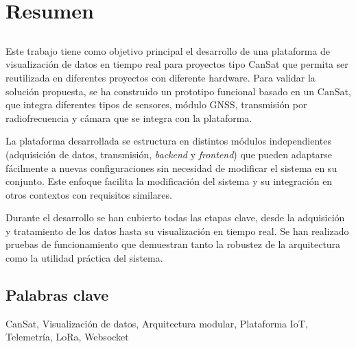 \chapter*{Resumen}


\section*{\titulo}

Este trabajo tiene como objetivo principal el desarrollo de una plataforma de visualización de datos en tiempo real para proyectos tipo CanSat que permita ser reutilizada en diferentes proyectos con diferente hardware.
Para validar la solución propuesta, se ha construido un prototipo funcional basado en un CanSat, que integra diferentes tipos de sensores, módulo GNSS, transmisión por radiofrecuencia y cámara que  se integra con la plataforma.

La plataforma desarrollada se estructura en distintos módulos independientes (adquisición de datos, transmisión, \emph{backend} y \emph{frontend}) que pueden adaptarse fácilmente a nuevas configuraciones sin necesidad de modificar el sistema en su conjunto.
Este enfoque facilita la modificación del sistema y su integración en otros contextos con requisitos similares.

Durante el desarrollo se han cubierto todas las etapas clave, desde la adquisición y tratamiento de los datos hasta su visualización en tiempo real.
Se han realizado pruebas de funcionamiento que demuestran tanto la robustez de la arquitectura como la utilidad práctica del sistema.


\section*{Palabras clave}

\noindent CanSat, Visualización de datos, Arquitectura modular, Plataforma IoT, Telemetría, LoRa, Websocket


   


